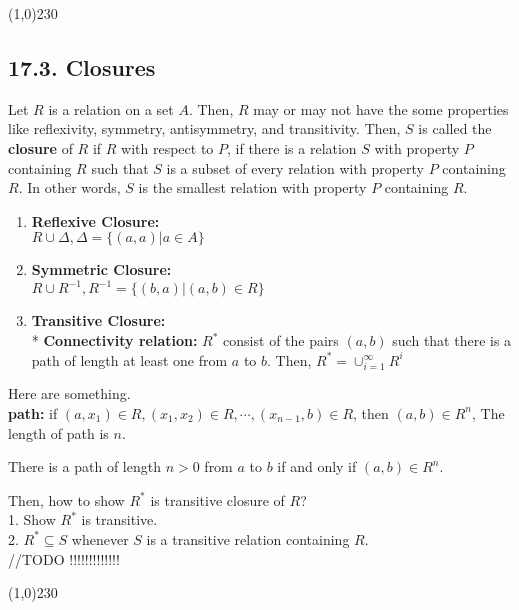 \begin{center}
\line(1,0){230}
\end{center}

\subsection*{17.3. Closures}

Let $R$ is a relation on a set $A$. Then, $R$ may or may not have the some properties like reflexivity, symmetry, antisymmetry, and transitivity. Then, $S$ is called the \textbf{closure} of $R$ if $R$ with respect to $P$, if there is a relation $S$ with property $P$ containing $R$ such that $S$ is a subset of every relation with property $P$ containing $R$. In other words, $S$ is the smallest relation with property $P$ containing $R$. \\
\begin{enumerate}
    \item \textbf{Reflexive Closure: } \\
    $R \cup \Delta, \Delta = \{(a, a) | a \in A\}$
    \item \textbf{Symmetric Closure: } \\
    $R \cup R^{-1}, R^{-1} = \{(b, a) | (a, b) \in R\}$
    \item \textbf{Transitive Closure: } \\
    * \textbf{Connectivity relation:} $R^*$ consist of the pairs $(a, b)$ such that there is a path of length at least one from $a$ to $b$. Then, $R^* = \cup _{i=1}^{\infty} R^i$
\end{enumerate}
Here are something.\\
\textbf{path: } if $(a, x_1) \in R, (x_1, x_2) \in R, \cdots, (x_{n-1}, b) \in R$, then $(a, b) \in R^n$, The length of path is $n$.
\begin{theorem}
    There is a path of length $n > 0$ from $a$ to $b$ if and only if $(a, b) \in R^n$.
\end{theorem} 

\noindent
Then, how to show $R^*$ is transitive closure of $R$? \\
1. Show $R^*$ is transitive. \\
2. $R^* \subseteq S$ whenever $S$ is a transitive relation containing $R$. \\
//TODO !!!!!!!!!!!!!

\begin{center}
\line(1,0){230}
\end{center}

